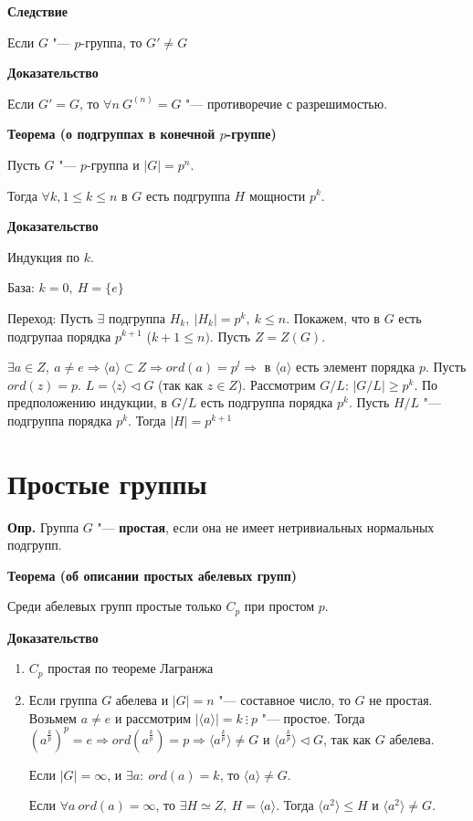 \documentclass{article}
\begin{document}
\vspace{10pt}

\textbf{Следствие}

Если $G$ "--- $p$-группа, то $G' \neq G$

\textbf{Доказательство}

Если $G' = G$, то $\forall n \  G^{(n)} = G$ "--- противоречие с разрешимостью.

\vspace{10pt}

\textbf{Теорема (о подгруппах в конечной $p$-группе)}

Пусть $G$ "--- $p$-группа и $|G| = p^n$.

Тогда $\forall k, 1 \leq k \leq n$ в $G$ есть подгруппа $H$ мощности $p^k$.

\textbf{Доказательство}

Индукция по $k$.

База: $k = 0, \  H = \{e\}$

Переход: Пусть $\exists$ подгруппа $H_k, \  |H_k| = p^k, \  k \leq n$. Покажем, что в $G$ есть подгрупаа порядка $p^{k+1}$ ($k + 1 \leq n)$. Пусть $Z = Z(G)$.

$\exists a \in Z, \  a \neq e \Rightarrow \langle a \rangle \subset Z \Rightarrow ord(a) = p^l \Rightarrow$ в $\langle a \rangle$ есть элемент порядка $p$. Пусть $ord(z) = p$. $L = \langle z \rangle \triangleleft G$ (так как $z \in Z$). Рассмотрим $G/L$: $|G/L| \geq p^k$. По предположению индукции, в $G/L$ есть подгруппа порядка $p^k$. Пусть $H/L$ "--- подгруппа порядка $p^k$. Тогда $|H| = p^{k+1}$

\section{Простые группы}

\textbf{Опр.} Группа $G$ "--- \textbf{простая}, если она не имеет нетривиальных нормальных подгрупп.

\vspace{5pt}

\textbf{Теорема (об описании простых абелевых групп)}

Среди абелевых групп простые только $C_p$ при простом $p$.

\textbf{Доказательство}
\begin{enumerate}
	\item $C_p$ простая по теореме Лагранжа
	\item Если группа $G$ абелева и $|G| = n$ "--- составное число, то $G$ не простая. Возьмем $a \neq e$ и рассмотрим $|\langle a \rangle| = k \  \vdots \  p$ "--- простое. Тогда $(a^{\frac{k}{p}})^p = e \Rightarrow ord(a^{\frac{k}{p}}) = p \Rightarrow \langle a^{\frac{k}{p}} \rangle \neq G$ и $\langle a^{\frac{k}{p}} \rangle \triangleleft G$, так как $G$ абелева.
	
	Если $|G| = \infty$, и $\exists a: \  ord(a) = k$, то $\langle a \rangle \neq G$.
	
	Если $\forall a \  ord(a) = \infty$, то $\exists H \simeq Z, \  H = \langle a \rangle$. Тогда $\langle a^2 \rangle \leq H$ и $\langle a^2 \rangle \neq G$.
\end{enumerate}
\end{document}
